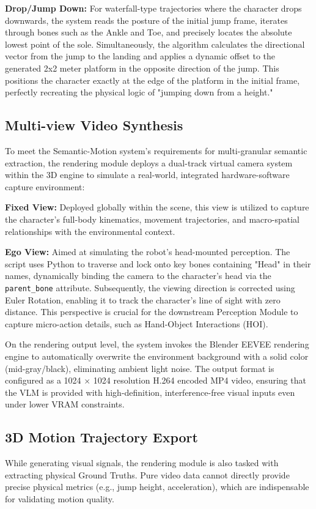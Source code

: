 \documentclass[11pt,oneside]{report}
\begin{document}
\textbf{Drop/Jump Down:} For waterfall-type trajectories where the character drops downwards, the system reads the posture of the initial jump frame, iterates through bones such as the Ankle and Toe, and precisely locates the absolute lowest point of the sole. Simultaneously, the algorithm calculates the directional vector from the jump to the landing and applies a dynamic offset to the generated 2x2 meter platform in the opposite direction of the jump. This positions the character exactly at the edge of the platform in the initial frame, perfectly recreating the physical logic of "jumping down from a height."

\subsection{Multi-view Video Synthesis}
To meet the Semantic-Motion system's requirements for multi-granular semantic extraction, the rendering module deploys a dual-track virtual camera system within the 3D engine to simulate a real-world, integrated hardware-software capture environment:

\textbf{Fixed View:} Deployed globally within the scene, this view is utilized to capture the character's full-body kinematics, movement trajectories, and macro-spatial relationships with the environmental context.

\textbf{Ego View:} Aimed at simulating the robot's head-mounted perception. The script uses Python to traverse and lock onto key bones containing "Head" in their names, dynamically binding the camera to the character's head via the \texttt{parent\_bone} attribute. Subsequently, the viewing direction is corrected using Euler Rotation, enabling it to track the character's line of sight with zero distance. This perspective is crucial for the downstream Perception Module to capture micro-action details, such as Hand-Object Interactions (HOI).

On the rendering output level, the system invokes the Blender EEVEE rendering engine to automatically overwrite the environment background with a solid color (mid-gray/black), eliminating ambient light noise. The output format is configured as a 1024 $\times$ 1024 resolution H.264 encoded MP4 video, ensuring that the VLM is provided with high-definition, interference-free visual inputs even under lower VRAM constraints.

\subsection{3D Motion Trajectory Export}
While generating visual signals, the rendering module is also tasked with extracting physical Ground Truths. Pure video data cannot directly provide precise physical metrics (e.g., jump height, acceleration), which are indispensable for validating motion quality.
\end{document}

